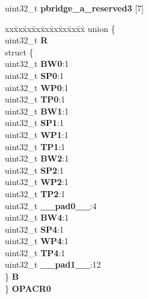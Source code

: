 \begin{DoxyCompactItemize}
\begin{tabbing}
\end{tabbing}\item 
\mbox{\label{structPBRIDGE__A__tag_a1c1d4c42730e1602529796ba3da6029b}} 
uint32\+\_\+t {\bfseries pbridge\+\_\+a\+\_\+reserved3} \mbox{[}7\mbox{]}
\item 
\mbox{\label{structPBRIDGE__A__tag_a1df49282d6f34fc19b226e648ebf0985}} 
\begin{tabbing}
xx\=xx\=xx\=xx\=xx\=xx\=xx\=xx\=xx\=\kill
union \{\\
\>uint32\_t {\bfseries R}\\
\>struct \{\\
\>\>uint32\_t {\bfseries BW0}:1\\
\>\>uint32\_t {\bfseries SP0}:1\\
\>\>uint32\_t {\bfseries WP0}:1\\
\>\>uint32\_t {\bfseries TP0}:1\\
\>\>uint32\_t {\bfseries BW1}:1\\
\>\>uint32\_t {\bfseries SP1}:1\\
\>\>uint32\_t {\bfseries WP1}:1\\
\>\>uint32\_t {\bfseries TP1}:1\\
\>\>uint32\_t {\bfseries BW2}:1\\
\>\>uint32\_t {\bfseries SP2}:1\\
\>\>uint32\_t {\bfseries WP2}:1\\
\>\>uint32\_t {\bfseries TP2}:1\\
\>\>uint32\_t {\bfseries \_\_pad0\_\_}:4\\
\>\>uint32\_t {\bfseries BW4}:1\\
\>\>uint32\_t {\bfseries SP4}:1\\
\>\>uint32\_t {\bfseries WP4}:1\\
\>\>uint32\_t {\bfseries TP4}:1\\
\>\>uint32\_t {\bfseries \_\_pad1\_\_}:12\\
\>\} {\bfseries B}\\
\} {\bfseries OPACR0}\\


\end{tabbing}
\end{DoxyCompactItemize}
